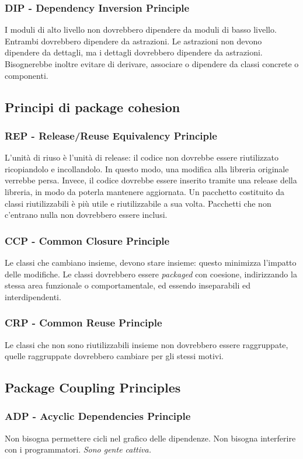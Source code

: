 \documentclass[11pt]{article}
\begin{document}
\subsubsection{DIP - Dependency Inversion Principle}
I moduli di alto livello non dovrebbero dipendere da moduli di basso livello. Entrambi dovrebbero dipendere da astrazioni. Le astrazioni non devono dipendere da dettagli, ma i dettagli dovrebbero dipendere da astrazioni. Bisognerebbe inoltre evitare di derivare, associare o dipendere da classi concrete o componenti. 
\subsection{Principi di package cohesion}
\subsubsection{REP - Release/Reuse Equivalency Principle}
L'unità di riuso è l'unità di release: il codice non dovrebbe essere riutilizzato ricopiandolo e incollandolo. In questo modo, una modifica alla libreria originale verrebbe persa. Invece, il codice dovrebbe essere inserito tramite una release della libreria, in modo da poterla mantenere aggiornata. Un pacchetto costituito da classi riutilizzabili è più utile e riutilizzabile a sua volta. Pacchetti che non c'entrano nulla non dovrebbero essere inclusi. 
\subsubsection{CCP - Common Closure Principle}
Le classi che cambiano insieme, devono stare insieme: questo minimizza l'impatto delle modifiche. Le classi dovrebbero essere \textit{packaged} con coesione, indirizzando la stessa area funzionale o comportamentale, ed essendo inseparabili ed interdipendenti. 
\subsubsection{CRP - Common Reuse Principle}
Le classi che non sono riutilizzabili insieme non dovrebbero essere raggruppate, quelle raggruppate dovrebbero cambiare per gli stessi motivi. 
\subsection{Package Coupling Principles}
\subsubsection{ADP - Acyclic Dependencies Principle}
Non bisogna permettere cicli nel grafico delle dipendenze. Non bisogna interferire con i programmatori. \textit{Sono gente cattiva.}
\end{document}
